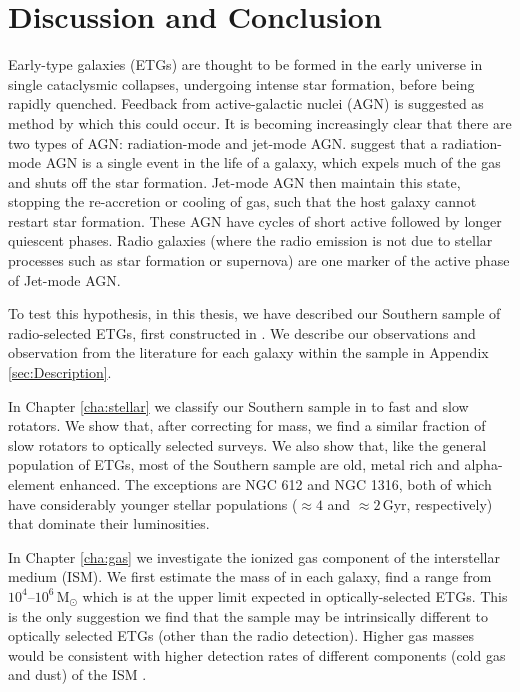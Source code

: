 \chapter{Discussion and Conclusion}
	\label{cha:conclusion}
Early-type galaxies (ETGs) are thought to be formed in the early universe in single cataclysmic collapses, undergoing intense star formation, before being rapidly quenched. Feedback from active-galactic nuclei (AGN) is suggested as method by which this could occur. It is becoming increasingly clear that there are two types of AGN: radiation-mode and jet-mode AGN. \citet{Heckman2014} suggest that a radiation-mode AGN is a single event in the life of a galaxy, which expels much of the gas and shuts off the star formation. Jet-mode AGN then maintain this state, stopping the re-accretion or cooling of gas, such that the host galaxy cannot restart star formation. These AGN have cycles of short active followed by longer quiescent phases. Radio galaxies (where the radio emission is not due to stellar processes such as star formation or supernova) are one marker of the active phase of Jet-mode AGN. 

To test this hypothesis, in this thesis, we have described our Southern sample of radio-selected ETGs, first constructed in \citet{Prandoni2010}. We describe our observations and observation from the literature for each galaxy within the sample in Appendix \ref{sec:Description}. 

In Chapter \ref{cha:stellar} we classify our Southern sample in to fast and slow rotators. We show that, after correcting for mass, we find a similar fraction of slow rotators to optically selected surveys. We also show that, like the general population of ETGs, most of the Southern sample are old, metal rich and alpha-element enhanced. The exceptions are NGC 612 and NGC 1316, both of which have considerably younger stellar populations ($\approx 4$ and $\approx 2$\,Gyr, respectively) that dominate their luminosities. 

In Chapter \ref{cha:gas} we investigate the ionized gas component of the interstellar medium (ISM). We first estimate the mass of  in each galaxy, find a range from $10^4$--$10^6\,\mathrm{M_\odot}$ which is at the upper limit expected in optically-selected ETGs. This is the only suggestion we find that the sample may be intrinsically different to optically selected ETGs (other than the radio detection). Higher gas masses would be consistent with higher detection rates of different components (cold gas and dust) of the ISM \citep[e.g.][]{deRuiter2002, Leon2003, VerdoesKleijn2005}. 

